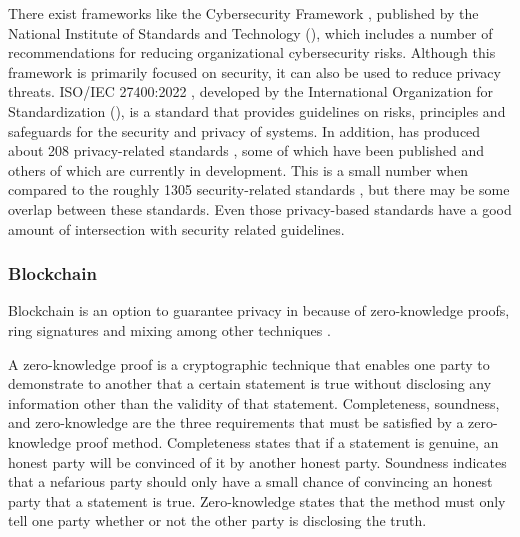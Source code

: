 There exist frameworks like the \hyperlink{\acronym}{\acronym} Cybersecurity Framework \cite{barrett2018framework},
published by the National Institute of Standards and Technology (\hyperlink{\acronym}{\acronym}),
which includes a number of recommendations for reducing organizational
cybersecurity risks. Although this framework is primarily focused on
security, it can also be used to reduce privacy threats.
ISO/IEC 27400:2022 \cite{iso2022cybersecurity}, developed by the International
Organization for Standardization (\hyperlink{\acronym}{\acronym}), is a standard that provides
guidelines on risks, principles and safeguards for the security and
privacy of \hyperlink{\acronym}{\acronym} systems. In addition, \hyperlink{\acronym}{\acronym} has produced about 208 privacy-related
standards \cite{iso2023privacysearch}, some of which have been published
and others of which are currently in development. This is a small number
when compared to the roughly 1305 security-related standards \cite{iso2023securitysearch},
but there may be some overlap between these standards. Even those \hyperlink{\acronym}{\acronym} privacy-based
standards have a good amount of intersection with security related
guidelines.

\subsubsection{Blockchain}\label{subsubsection:blockchain}

Blockchain is an option to guarantee privacy in \hyperlink{\acronym}{\acronym} because of zero-knowledge
proofs\cite{sun2021survey}, ring signatures \cite{mercer2016privacy} and mixing \cite{stone2021trustless}
among other techniques \cite{zhang2019security}.

A zero-knowledge proof is a cryptographic technique that enables one party
to demonstrate to another that a certain statement is true without disclosing
any information other than the validity of that statement. Completeness, soundness,
and zero-knowledge are the three requirements that must be satisfied by a
zero-knowledge proof method. Completeness states that if a
statement is genuine, an honest party will be convinced of it by another honest
party. Soundness indicates that a nefarious party should only have a small chance
of convincing an honest party that a statement is true. Zero-knowledge states
that the method must only tell one party whether or not the other party is
disclosing the truth.

